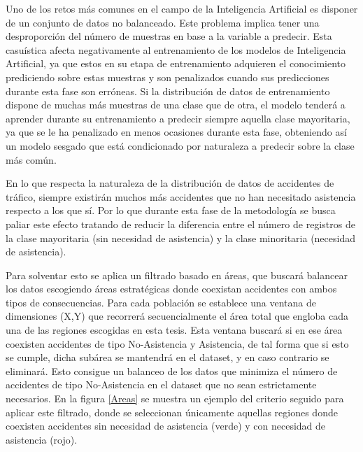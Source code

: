 \documentclass{uathesis-es}
\begin{document}
Uno de los retos más comunes en el campo de la Inteligencia Artificial es disponer de un conjunto de datos no balanceado. Este problema implica tener una desproporción del número de muestras en base a la variable a predecir. Esta casuística afecta negativamente al entrenamiento de los modelos de Inteligencia Artificial, ya que estos en su etapa de entrenamiento adquieren el conocimiento prediciendo sobre estas muestras y son penalizados cuando sus predicciones durante esta fase son erróneas. Si la distribución de datos de entrenamiento dispone de muchas más muestras de una clase que de otra, el modelo tenderá a aprender durante su entrenamiento a predecir siempre aquella clase mayoritaria, ya que se le ha penalizado en menos ocasiones durante esta fase, obteniendo así un modelo sesgado que está condicionado por naturaleza a predecir sobre la clase más común.

En lo que respecta la naturaleza de la distribución de datos de accidentes de tráfico, siempre existirán muchos más accidentes que no han necesitado asistencia respecto a los que sí. Por lo que durante esta fase de la metodología se busca paliar este efecto tratando de reducir la diferencia entre el número de registros de la clase mayoritaria (sin necesidad de asistencia) y la clase minoritaria (necesidad de asistencia).

Para solventar esto se aplica un filtrado basado en áreas, que buscará balancear los datos escogiendo áreas estratégicas donde coexistan accidentes con ambos tipos de consecuencias. Para cada población se establece una ventana de dimensiones (X,Y) que recorrerá secuencialmente el área total que engloba cada una de las regiones escogidas en esta tesis. Esta ventana buscará si en ese área coexisten accidentes de tipo No-Asistencia y Asistencia, de tal forma que si esto se cumple, dicha subárea se mantendrá en el dataset, y en caso contrario se eliminará. Esto consigue un balanceo de los datos que minimiza el número de accidentes de tipo No-Asistencia en el dataset que no sean estrictamente necesarios. En la figura \ref{Areas} se muestra un ejemplo del criterio seguido para aplicar este filtrado, donde se seleccionan únicamente aquellas regiones donde coexisten accidentes sin necesidad de asistencia (verde) y con necesidad de asistencia (rojo).
\end{document}
